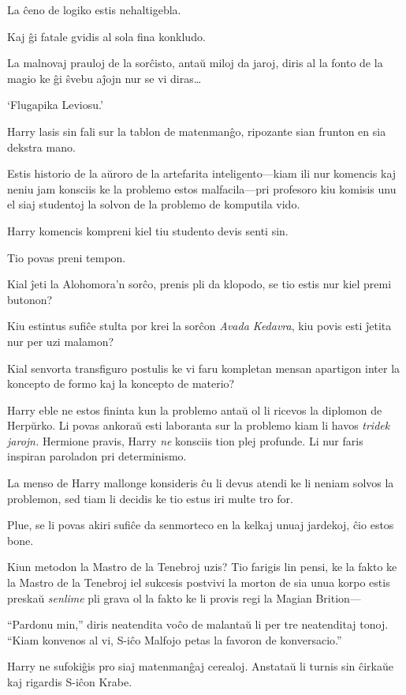 La ĉeno de logiko estis nehaltigebla.

Kaj ĝi fatale gvidis al sola fina konkludo.

La malnovaj prauloj de la sorĉisto, antaŭ miloj da jaroj, diris al la
fonto de la magio ke ĝi ŝvebu aĵojn nur se vi diras\ldots{}

`Flugapika Leviosu.'

Harry lasis sin fali sur la tablon de matenmanĝo, ripozante sian
frunton en sia dekstra mano.

Estis historio de la aŭroro de la artefarita inteligento—kiam ili nur
komencis kaj neniu jam konsciis ke la problemo estos malfacila—pri
profesoro kiu komisis unu el siaj studentoj la solvon de la problemo
de komputila vido.

Harry komencis kompreni kiel tiu studento devis senti sin.

Tio povas preni tempon.

Kial ĵeti la Alohomora'n sorĉo, prenis pli da klopodo, se tio estis nur
kiel premi butonon?

Kiu estintus sufiĉe stulta por krei la sorĉon \emph{Avada Kedavra},
kiu povis esti ĵetita nur per uzi malamon?

Kial senvorta transfiguro postulis ke vi faru kompletan mensan
apartigon inter la koncepto de formo kaj la koncepto de materio?

Harry eble ne estos fininta kun la problemo antaŭ ol li ricevos la
diplomon de Herpŭrko. Li povas ankoraŭ esti laboranta sur la problemo
kiam li havos \emph{tridek jarojn.} Hermione pravis, Harry \emph{ne}
konsciis tion plej profunde. Li nur faris inspiran paroladon pri
determinismo.

La menso de Harry mallonge konsideris ĉu li devus atendi ke li neniam
solvos la problemon, sed tiam li decidis ke tio estus iri multe tro
for.

Plue, se li povas akiri sufiĉe da senmorteco en la kelkaj unuaj
jardekoj, ĉio estos bone.

Kiun metodon la Mastro de la Tenebroj uzis? Tio farigis lin pensi, ke
la fakto ke la Mastro de la Tenebroj iel sukcesis postvivi la morton
de sia unua korpo estis preskaŭ \emph{senlime} pli grava ol la fakto
ke li provis regi la Magian Brition—

``Pardonu min,'' diris neatendita voĉo de malantaŭ li per tre
neatenditaj tonoj. ``Kiam konvenos al vi, S-iĉo Malfojo petas la
favoron de konversacio.''

Harry ne sufokiĝis pro siaj matenmanĝaj cerealoj. Anstataŭ li turnis
sin ĉirkaŭe kaj rigardis S-iĉon Krabe.

